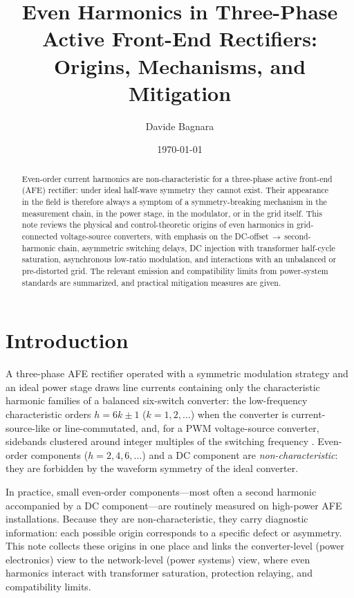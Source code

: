 \documentclass[11pt,a4paper]{article}
\title{Even Harmonics in Three-Phase Active Front-End Rectifiers:\\
Origins, Mechanisms, and Mitigation}
\author{Davide Bagnara}
\date{\today}
\begin{document}
\maketitle

\begin{abstract}
Even-order current harmonics are non-characteristic for a three-phase active
front-end (AFE) rectifier: under ideal half-wave symmetry they cannot exist.
Their appearance in the field is therefore always a symptom of a symmetry-breaking
mechanism in the measurement chain, in the power stage, in the modulator, or in
the grid itself. This note reviews the physical and control-theoretic origins of
even harmonics in grid-connected voltage-source converters, with emphasis on the
DC-offset\,$\rightarrow$\,second-harmonic chain, asymmetric switching delays,
DC injection with transformer half-cycle saturation, asynchronous low-ratio
modulation, and interactions with an unbalanced or pre-distorted grid. The
relevant emission and compatibility limits from power-system standards are
summarized, and practical mitigation measures are given.
\end{abstract}

\section{Introduction}

A three-phase AFE rectifier operated with a symmetric modulation strategy and an
ideal power stage draws line currents containing only the characteristic
harmonic families of a balanced six-switch converter: the low-frequency
characteristic orders $h = 6k \pm 1$ ($k = 1, 2, \dots$) when the converter is
current-source-like or line-commutated, and, for a PWM voltage-source converter,
sidebands clustered around integer multiples of the switching frequency
\cite{mohan,holmes}. Even-order components ($h = 2, 4, 6, \dots$) and a DC
component are \emph{non-characteristic}: they are forbidden by the waveform
symmetry of the ideal converter.

In practice, small even-order components---most often a second harmonic
accompanied by a DC component---are routinely measured on high-power AFE
installations. Because they are non-characteristic, they carry diagnostic
information: each possible origin corresponds to a specific defect or asymmetry.
This note collects these origins in one place and links the converter-level
(power electronics) view to the network-level (power systems) view, where even
harmonics interact with transformer saturation, protection relaying, and
compatibility limits.
\end{document}
